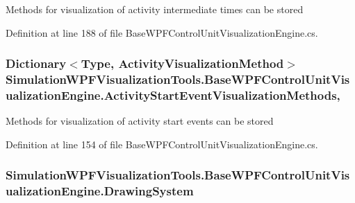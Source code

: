Methods for visualization of activity intermediate times can be stored 



Definition at line 188 of file Base\+W\+P\+F\+Control\+Unit\+Visualization\+Engine.\+cs.

\subsubsection[{\texorpdfstring{Activity\+Start\+Event\+Visualization\+Methods}{ActivityStartEventVisualizationMethods}}]{\setlength{\rightskip}{0pt plus 5cm}Dictionary$<$Type, {\bf Activity\+Visualization\+Method}$>$ Simulation\+W\+P\+F\+Visualization\+Tools.\+Base\+W\+P\+F\+Control\+Unit\+Visualization\+Engine.\+Activity\+Start\+Event\+Visualization\+Methods\hspace{0.3cm}{\ttfamily [get]}, {\ttfamily [protected]}}\hypertarget{class_simulation_w_p_f_visualization_tools_1_1_base_w_p_f_control_unit_visualization_engine_af72f38fd97a3f7db427ae07156b894b0}{}\label{class_simulation_w_p_f_visualization_tools_1_1_base_w_p_f_control_unit_visualization_engine_af72f38fd97a3f7db427ae07156b894b0}


Methods for visualization of activity start events can be stored 



Definition at line 154 of file Base\+W\+P\+F\+Control\+Unit\+Visualization\+Engine.\+cs.

\subsubsection[{\texorpdfstring{Drawing\+System}{DrawingSystem}}]{ Simulation\+W\+P\+F\+Visualization\+Tools.\+Base\+W\+P\+F\+Control\+Unit\+Visualization\+Engine.\+Drawing\+System\hspace{0.3cm}{\ttfamily [get]}}\hypertarget{class_simulation_w_p_f_visualization_tools_1_1_base_w_p_f_control_unit_visualization_engine_a34be4e7c196154b4ee685030d372915b}{}\label{class_simulation_w_p_f_visualization_tools_1_1_base_w_p_f_control_unit_visualization_engine_a34be4e7c196154b4ee685030d372915b}


